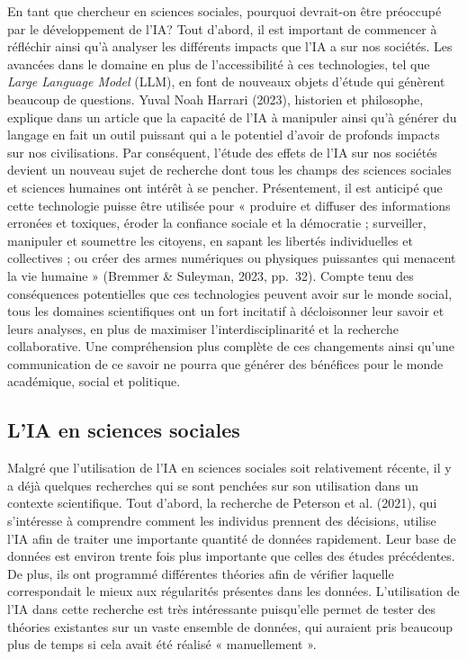 \documentclass[
  letterpaper,
  DIV=11,
  numbers=noendperiod,
  oneside]{scrreprt}
\begin{document}
En tant que chercheur en sciences sociales, pourquoi devrait-on être
préoccupé par le développement de l'IA? Tout d'abord, il est important
de commencer à réfléchir ainsi qu'à analyser les différents impacts que
l'IA a sur nos sociétés. Les avancées dans le domaine en plus de
l'accessibilité à ces technologies, tel que \emph{Large Language Model}
(LLM), en font de nouveaux objets d'étude qui génèrent beaucoup de
questions. Yuval Noah Harrari (2023), historien et philosophe, explique
dans un article que la capacité de l'IA à manipuler ainsi qu'à générer
du langage en fait un outil puissant qui a le potentiel d'avoir de
profonds impacts sur nos civilisations. Par conséquent, l'étude des
effets de l'IA sur nos sociétés devient un nouveau sujet de recherche
dont tous les champs des sciences sociales et sciences humaines ont
intérêt à se pencher. Présentement, il est anticipé que cette
technologie puisse être utilisée pour « produire et diffuser des
informations erronées et toxiques, éroder la confiance sociale et la
démocratie ; surveiller, manipuler et soumettre les citoyens, en sapant
les libertés individuelles et collectives ; ou créer des armes
numériques ou physiques puissantes qui menacent la vie humaine »
(Bremmer \& Suleyman, 2023, pp.~32). Compte tenu des conséquences
potentielles que ces technologies peuvent avoir sur le monde social,
tous les domaines scientifiques ont un fort incitatif à décloisonner
leur savoir et leurs analyses, en plus de maximiser
l'interdisciplinarité et la recherche collaborative. Une compréhension
plus complète de ces changements ainsi qu'une communication de ce savoir
ne pourra que générer des bénéfices pour le monde académique, social et
politique.

\hypertarget{lia-en-sciences-sociales}{%
\subsection{L'IA en sciences sociales}\label{lia-en-sciences-sociales}}

Malgré que l'utilisation de l'IA en sciences sociales soit relativement
récente, il y a déjà quelques recherches qui se sont penchées sur son
utilisation dans un contexte scientifique. Tout d'abord, la recherche de
Peterson et al. (2021), qui s'intéresse à comprendre comment les
individus prennent des décisions, utilise l'IA afin de traiter une
importante quantité de données rapidement. Leur base de données est
environ trente fois plus importante que celles des études précédentes.
De plus, ils ont programmé différentes théories afin de vérifier
laquelle correspondait le mieux aux régularités présentes dans les
données. L'utilisation de l'IA dans cette recherche est très
intéressante puisqu'elle permet de tester des théories existantes sur un
vaste ensemble de données, qui auraient pris beaucoup plus de temps si
cela avait été réalisé « manuellement ».
\end{document}
